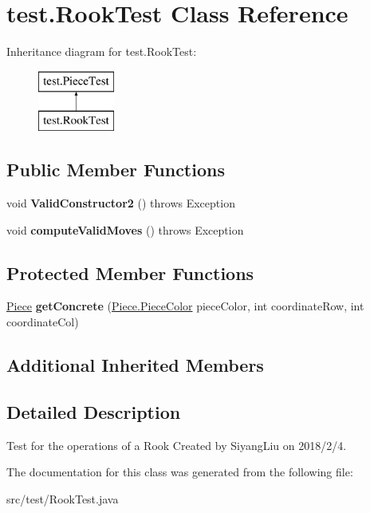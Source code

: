 \hypertarget{classtest_1_1_rook_test}{}\section{test.\+Rook\+Test Class Reference}
\label{classtest_1_1_rook_test}
Inheritance diagram for test.\+Rook\+Test\+:\begin{figure}[H]
\begin{center}
\leavevmode
\includegraphics[height=2.000000cm]{classtest_1_1_rook_test}
\end{center}
\end{figure}
\subsection*{Public Member Functions}
\begin{DoxyCompactItemize}
\item 
\mbox{\label{classtest_1_1_rook_test_a38216b286eae6ff708b28298ad322bae}} 
void {\bfseries Valid\+Constructor2} ()  throws Exception 
\item 
\mbox{\label{classtest_1_1_rook_test_ae43390f12cb6c38b537231331b78e82a}} 
void {\bfseries compute\+Valid\+Moves} ()  throws Exception 
\end{DoxyCompactItemize}
\subsection*{Protected Member Functions}
\begin{DoxyCompactItemize}
\item 
\mbox{\label{classtest_1_1_rook_test_ae20996d61c928faa97e7aeb11119ec68}} 
\mbox{\hyperlink{classpieces_1_1_piece}{Piece}} {\bfseries get\+Concrete} (\mbox{\hyperlink{enumpieces_1_1_piece_1_1_piece_color}{Piece.\+Piece\+Color}} piece\+Color, int coordinate\+Row, int coordinate\+Col)
\end{DoxyCompactItemize}
\subsection*{Additional Inherited Members}


\subsection{Detailed Description}
Test for the operations of a Rook Created by Siyang\+Liu on 2018/2/4. 

The documentation for this class was generated from the following file\+:\begin{DoxyCompactItemize}
\item 
src/test/Rook\+Test.\+java\end{DoxyCompactItemize}
